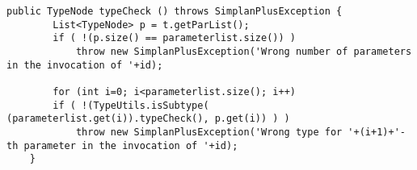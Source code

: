 \documentclass[../../main]{subfiles}
\begin{document}
\begin{lstlisting}[style=java]
    public TypeNode typeCheck () throws SimplanPlusException {  
        List<TypeNode> p = t.getParList();
        if ( !(p.size() == parameterlist.size()) )
            throw new SimplanPlusException('Wrong number of parameters in the invocation of '+id);
        
        for (int i=0; i<parameterlist.size(); i++)
        if ( !(TypeUtils.isSubtype( (parameterlist.get(i)).typeCheck(), p.get(i)) ) )
            throw new SimplanPlusException('Wrong type for '+(i+1)+'-th parameter in the invocation of '+id);
    }
       
\end{lstlisting}
\end{document}
